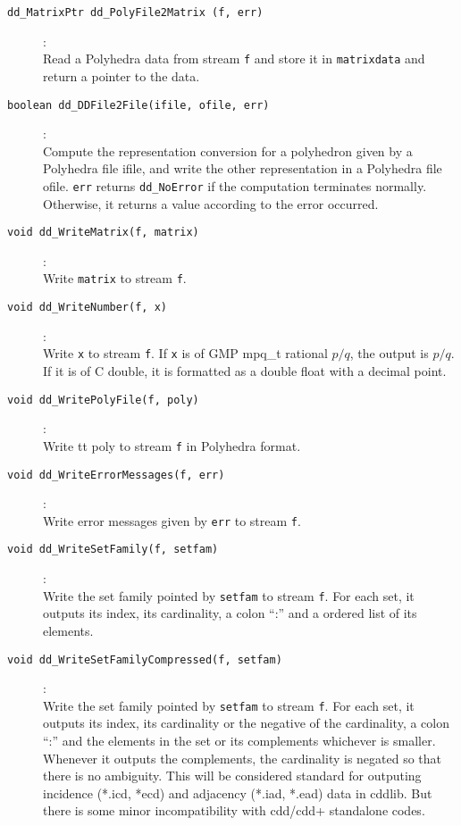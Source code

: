 \documentclass[11pt]{article}
\newcommand {\0} {{\bf 0}}
\begin{document}
\begin{description}

\item[{\tt dd\_MatrixPtr dd\_PolyFile2Matrix (f, err)}]:\\
Read a Polyhedra data from stream {\tt f} and store it in {\tt matrixdata}
and return a pointer to the data.

\item[{\tt boolean dd\_DDFile2File(ifile, ofile, err)}]:\\
Compute the representation conversion for a polyhedron given
by a Polyhedra file ifile, and write the other representation
in a Polyhedra file ofile.  {\tt *err}
returns {\tt dd\_NoError} if the computation terminates normally.  Otherwise,
it returns a value according to the error occurred.

\item[{\tt void dd\_WriteMatrix(f, matrix)}]:\\
Write {\tt  matrix} to stream {\tt f}.

\item[{\tt void dd\_WriteNumber(f, x)}]:\\
Write {\tt x} to stream {\tt f}.  If {\tt x} is of GMP mpq\_t rational $p/q$,
the output is $p/q$.  If it is of C double, it is formatted as a double float
with a decimal point.

\item[{\tt void dd\_WritePolyFile(f, poly)}]:\\
Write {tt poly} to stream {\tt f} in Polyhedra format.

\item[{\tt void dd\_WriteErrorMessages(f, err)}]:\\
Write error messages given by {\tt err} to stream {\tt f}.

\item[{\tt void dd\_WriteSetFamily(f, setfam)}]:\\
Write the set family pointed by {\tt setfam} to stream {\tt f}.
For each set, it outputs its index, its cardinality,
a colon ``:'' and a ordered list of its elements.

\item[{\tt void dd\_WriteSetFamilyCompressed(f, setfam)}]:\\
Write the set family pointed by {\tt setfam} to stream {\tt f}.
For each set, it outputs its index, its cardinality or the
negative of the cardinality, a colon ``:''
 and the elements in the set or its complements whichever is smaller.
Whenever it outputs the complements, the cardinality is negated
so that there is no ambiguity.
This will be considered standard for
outputing incidence (*.icd, *ecd) and adjacency
(*.iad, *.ead) data in cddlib.   But there is some minor incompatibility
with cdd/cdd+ standalone codes.


\end{description}
\end{document}

